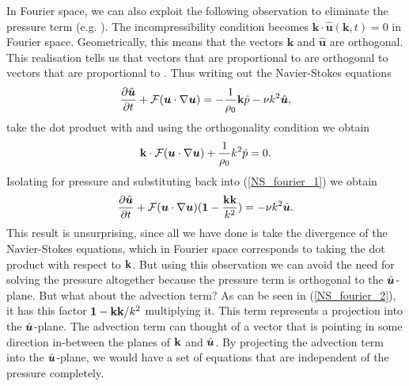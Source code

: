 In Fourier space, we can also exploit the following observation to eliminate the pressure term (e.g. \cite{lesieur}). The incompressibility condition becomes $\textbf{k}\cdot\hat{\bm{u}}(\textbf{k},t)=0$ in Fourier space. Geometrically, this means that the vectors $\textbf{k}$ and $\hat{\bm{u}}$ are orthogonal.  
This realisation tells us that vectors that are proportional to \uhatm are orthogonal to vectors that are proportional to \kvecm. Thus writing out the Navier-Stokes equations
\begin{align}
\frac{\partial \hat{\bm{u}}}{\partial t} + \mathcal{F}(\bm{u}\cdot\nabla\bm{u}) = -\frac{1}{\rho_{0}} \textbf{k}\hat{p} - \nu k^{2}\hat{\bm{u}}\label{NS_fourier_1},
\end{align}
take the dot product with \kvecm and using the orthogonality condition we obtain
\begin{align}
\textbf{k}\cdot\mathcal{F}(\bm{u}\cdot\nabla\bm{u}) + \frac{1}{\rho_{0}}k^{2}\hat{p}=0\label{pressure_fourier_1}.
\end{align}
Isolating for pressure and substituting back into (\ref{NS_fourier_1}) we obtain
\begin{align}
\frac{\partial \hat{\bm{u}}}{\partial t} + \mathcal{F}(\bm{u}\cdot\nabla\bm{u})(\textbf{1}-\frac{\textbf{k}\textbf{k}}{k^{2}})= - \nu k^{2}\hat{\bm{u}}\label{NS_fourier_2}.
\end{align}
This result is unsurprising, since all we have done is take the divergence of the Navier-Stokes equations, which in Fourier space corresponds to taking the dot product with respect to $\textbf{k}$. But using this observation we can avoid the need for solving the pressure altogether because the pressure term is orthogonal to the $\hat{\bm{u}}$-plane. But what about the advection term? As can be seen in (\ref{NS_fourier_2}), it has this factor $\textbf{1} - \textbf{k}\textbf{k}/k^{2}$ multiplying it. This term represents a projection into the $\hat{\bm{u}}$-plane. The advection term can thought of a vector that is pointing in some direction in-between the planes of $\textbf{k}$ and $\hat{\bm{u}}$. By projecting the advection term into the $\hat{\bm{u}}$-plane, we would have a set of equations that are independent of the pressure completely.

